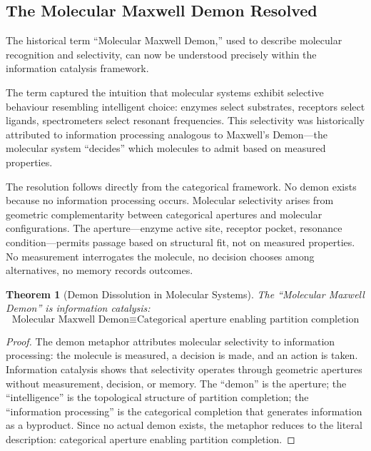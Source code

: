 \documentclass[twocolumn,10pt,a4paper]{article}
\newtheorem{theorem}{Theorem}[section]
\theoremstyle{definition}
\theoremstyle{remark}
\begin{document}
\subsection{The Molecular Maxwell Demon Resolved}

The historical term ``Molecular Maxwell Demon,'' used to describe molecular recognition and selectivity, can now be understood precisely within the information catalysis framework.

The term captured the intuition that molecular systems exhibit selective behaviour resembling intelligent choice: enzymes select substrates, receptors select ligands, spectrometers select resonant frequencies. This selectivity was historically attributed to information processing analogous to Maxwell's Demon—the molecular system ``decides'' which molecules to admit based on measured properties.

The resolution follows directly from the categorical framework. No demon exists because no information processing occurs. Molecular selectivity arises from geometric complementarity between categorical apertures and molecular configurations. The aperture—enzyme active site, receptor pocket, resonance condition—permits passage based on structural fit, not on measured properties. No measurement interrogates the molecule, no decision chooses among alternatives, no memory records outcomes.

\begin{theorem}[Demon Dissolution in Molecular Systems]
\label{thm:molecular_demon}
The ``Molecular Maxwell Demon'' is information catalysis:
\begin{equation}
\text{Molecular Maxwell Demon} \equiv \text{Categorical aperture enabling partition completion}
\end{equation}
\end{theorem}

\begin{proof}
The demon metaphor attributes molecular selectivity to information processing: the molecule is measured, a decision is made, and an action is taken. Information catalysis shows that selectivity operates through geometric apertures without measurement, decision, or memory. The ``demon'' is the aperture; the ``intelligence'' is the topological structure of partition completion; the ``information processing'' is the categorical completion that generates information as a byproduct. Since no actual demon exists, the metaphor reduces to the literal description: categorical aperture enabling partition completion.
\end{proof}
\end{document}
